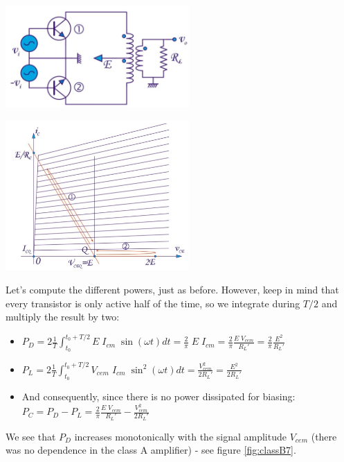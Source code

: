 \begin{minipage}{.5\textwidth}
	\centering
	\includegraphics[width=7cm]{figures/ch09/classB3.jpg}
	\label{fig:classB3}
\end{minipage}%
\begin{minipage}{.5\textwidth}
	\centering
	\includegraphics[width=7cm]{figures/ch09/classB4.jpg}
	\label{fig:classB4}
\end{minipage}
Let's compute the different powers, just as before. However, keep in mind that every transistor is only active half of the time, so we integrate during $T/2$ and multiply the result by two: %
\begin{itemize}
	\item $P_D = 2 \frac{1}{T} \int_{t_0}^{t_0 + T/2} E \; I_{cm} \; \sin(\omega t) dt = \frac{2}{\pi} \; E \; I_{cm}  = \frac{2}{\pi}\frac{E\;V_{cem}}{R_L'} = \frac{2}{\pi}\frac{E^2}{R_L'}$
	\item $P_L = 2 \frac{1}{T} \int_{t_0}^{t_0 + T/2} V_{cem} \; I_{cm} \; \sin^2(\omega t) dt = \frac{V_{cem}^2}{2R_L'} = \frac{E^2}{2R_L'}$
	\item And consequently, since there is no power dissipated for biasing: \\
	$P_C = P_D - P_L = \frac{2}{\pi} \frac{E\; V_{cem}}{R_L'} - \frac{V_{cem}^2}{2 R_L'}$
\end{itemize}
We see that $P_D$ increases monotonically with the signal amplitude $V_{cem}$ (there was no dependence in the class A amplifier) - see figure \ref{fig:classB7}.

